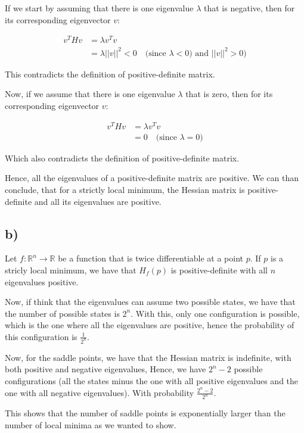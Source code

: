 \documentclass{article}
\begin{document}
If we start by assuming that there is one eigenvalue $\lambda$ that is negative, then for its corresponding eigenvector $v$:

\begin{align*}
    v^T H v &= \lambda v^T v \\
    &= \lambda ||v||^2 < 0 \quad \text{(since $\lambda < 0$) and $||v||^2 > 0$)}
\end{align*}

This contradicts the definition of positive-definite matrix.

Now, if we assume that there is one eigenvalue $\lambda$ that is zero, then for its corresponding eigenvector $v$:

\begin{align*}
    v^T H v &= \lambda v^T v \\
    &= 0 \quad \text{(since $\lambda = 0$)}
\end{align*}

Which also contradicts the definition of positive-definite matrix.

Hence, all the eigenvalues of a positive-definite matrix are positive. We can than conclude, that
for a strictly local minimum, the Hessian matrix is positive-definite and all its eigenvalues are positive.

\subsection*{b)}

Let $f: \mathbb{R}^n \rightarrow \mathbb{R}$ be a function that is twice differentiable at a point $p$. If $p$
is a stricly local minimum, we have that $H_f(p)$ is positive-definite with all $n$ eigenvalues positive.

Now, if think that the eigenvalues can assume two possible states, we have that the number of possible states is $2^n$.
With this, only one configuration is possible, which is the one where all the eigenvalues are positive, hence
the probability of this configuration is $\frac{1}{2^n}$.

Now, for the saddle points, we have that the Hessian matrix is indefinite, with both positive and negative eigenvalues, Hence,
we have $2^n - 2$ possible configurations (all the states minus the one with all positive eigenvalues and the one with all negative eigenvalues). With
probability $\frac{2^n - 2}{2^n}$. 

This shows that the number of saddle points is exponentially larger than the number of local minima as
we wanted to show.
\end{document}
